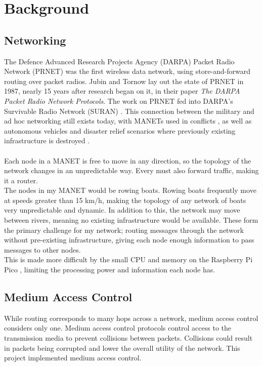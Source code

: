 \documentclass[12pt,a4paper]{report}
\begin{document}
\section{Background}
\subsection{Networking}
The Defence Advanced Research Projects Agency (DARPA) Packet Radio Network (PRNET) \cite{prnet} was the first wireless data network, using store-and-forward routing over packet radios. Jubin and Tornow lay out the state of PRNET in 1987, nearly 15 years after research began on it, in their paper \emph{The DARPA Packet Radio Network Protocols}. The work on PRNET fed into DARPA's Survivable Radio Network (SURAN) \cite{suran}. This connection between the military and ad hoc networking still exists today, with MANETs used in conflicts \cite{military}, as well as autonomous vehicles \cite{vehicle} and disaster relief scenarios where previously existing infrastructure is destroyed \cite{disaster}. \\ \\
Each node in a MANET is free to move  in any direction, so the topology of the network changes in an unpredictable way. Every must also forward traffic, making it a router. \\
The nodes in my MANET would be rowing boats. Rowing boats frequently move at speeds greater than 15 km/h, making the topology of any network of boats very unpredictable and dynamic. In addition to this, the network may move between rivers, meaning no existing infrastructure would be available. These form the primary challenge for my network; routing messages through the network without pre-existing infrastructure, giving each node enough information to pass messages to other nodes. \\
This is made more difficult by the small CPU and memory on the Raspberry Pi Pico \cite{rp2040}, limiting the processing power and information each node has.  \\
\subsection{Medium Access Control}
While routing corresponds to many hops across a network, medium access control considers only one. Medium access control protocols control access to the transmission media to prevent collisions between packets. Collisions could result in packets being corrupted and lower the overall utility of the network. This project implemented medium access control. \\
\end{document}
